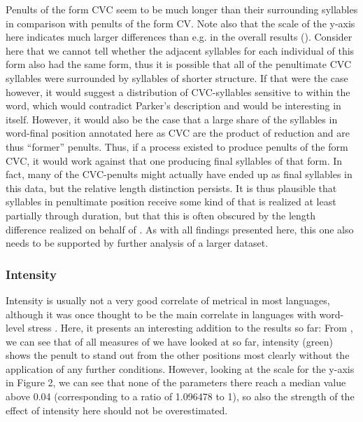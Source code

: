 \documentclass[output=paper]{LSP/langsci}
\begin{document}
Penults of the form CVC seem to be much longer than their surrounding syllables in comparison with penults of the form CV. Note also that the scale of the y-axis here indicates much larger differences than e.g. in the overall results (). Consider here that we cannot tell whether the adjacent syllables for each individual  of this form also had the same form, thus it is possible that all of the penultimate CVC syllables were surrounded by syllables of shorter structure. If that were the case however, it would suggest a distribution of CVC-syllables sensitive to  within the word, which would contradict Parker’s description and would be interesting in itself. However, it would also be the case that a large share of the syllables in word-final position annotated here as CVC are the product of  reduction and are thus “former” penults. Thus, if a process existed to produce penults of the form CVC, it would work against that one producing final syllables of that form. In fact, many of the CVC-penults might actually have ended up as final syllables in this data, but the relative length distinction persists. It is thus plausible that syllables in penultimate position receive some kind of  that is realized at least partially through duration, but that this is often obscured by the length difference realized on behalf of . As with all findings presented here, this one also needs to be supported by further analysis of a larger dataset.   

\largerpage
\subsubsection{Intensity} 
Intensity is usually not a very good correlate of metrical  in most languages, although it was once thought to be the main correlate in languages with word-level stress \citep{Beckman1986}. Here, it presents an interesting addition to the results so far: From , we can see that of all measures of  we have looked at so far, intensity (green) shows the penult to stand out from the other positions most clearly without the application of any further conditions. However, looking at the scale for the y-axis in Figure 2, we can see that none of the parameters there reach a median value above 0.04 (corresponding to a ratio of 1.096478 to 1), so also the strength of the effect of intensity here should not be overestimated.
\end{document}
